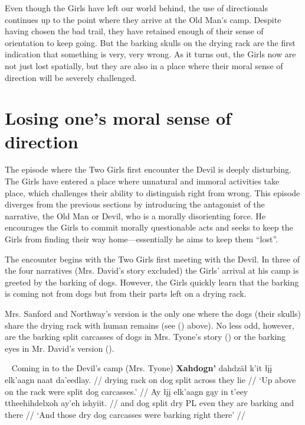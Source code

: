Even though the Girls have left our world behind, the use of directionals continues up to the point where they arrive at the Old Man's camp. Despite having chosen the bad trail, they have retained enough of their sense of orientation to keep going. But the barking skulls on the drying rack are the first indication that something is very, very wrong. As it turns out, the Girls now are not just lost spatially, but they are also in a place where their moral sense of direction will be severely challenged.

\section{Losing one's moral sense of direction}
\label{section:losing-moral-direction}

The episode where the Two Girls first encounter the Devil is deeply disturbing. The Girls have entered a place where unnatural and immoral activities take place, which challenges their ability to distinguish right from wrong. This episode diverges from the previous sections by introducing the antagonist of the narrative, the Old Man or Devil, who is a morally disorienting force. He encourages the Girls to commit morally questionable acts and seeks to keep the Girls from finding their way home—essentially he aims to keep them ``lost''.

The encounter begins with the Two Girls first meeting with the Devil. In three of the four narratives (Mrs. David's story excluded) the Girls' arrival at his camp is greeted by the barking of dogs. However, the Girls quickly learn that the barking is coming not from dogs but from their parts left on a drying rack.

Mrs. Sanford and Northway's version is the only one where the dogs (their skulls) share the drying rack with human remains (see () above). No less odd, however, are the barking split carcasses of dogs in Mrs. Tyone's story () or the barking eyes in Mr. David's version ().

\pex~ Coming in to the Devil's camp (Mrs. Tyone) 
\a
\begingl
\gla \textbf{Xahdogn'} dahdzäł k'it łįį elk'aagn naat da'eedlay.   //
 {drying rack} on dog split across {they lie}  //
\glft `Up above on the rack were split dog carcasses.' //
\endgl
\a
\begingl
\gla  Ay łįį elk'aagn gąy in t'eey ttheehihdelxoh ay'eh ishyiit.  //
\glb  and dog split dry PL even {they are barking} and there //
\glft `And those dry dog carcasses were barking right there' //
\endgl
\xe


